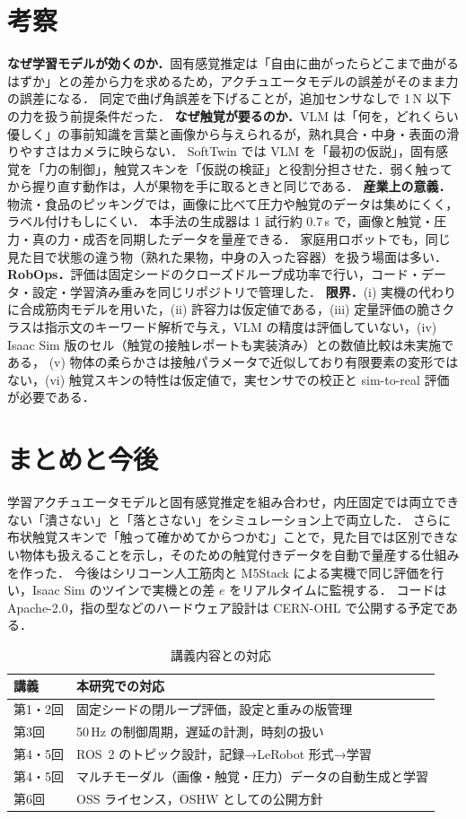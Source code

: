 \documentclass[a4paper,twocolumn,10pt]{ltjsarticle}
\begin{document}
\section{考察}
\textbf{なぜ学習モデルが効くのか．}固有感覚推定は「自由に曲がったらどこまで曲がるはずか」との差から力を求めるため，アクチュエータモデルの誤差がそのまま力の誤差になる．
同定で曲げ角誤差を下げることが，追加センサなしで 1\,N 以下の力を扱う前提条件だった．
\textbf{なぜ触覚が要るのか．}VLM は「何を，どれくらい優しく」の事前知識を言葉と画像から与えられるが，熟れ具合・中身・表面の滑りやすさはカメラに映らない．
SoftTwin では VLM を「最初の仮説」，固有感覚を「力の制御」，触覚スキンを「仮説の検証」と役割分担させた．弱く触ってから握り直す動作は，人が果物を手に取るときと同じである．
\textbf{産業上の意義．}物流・食品のピッキングでは，画像に比べて圧力や触覚のデータは集めにくく，ラベル付けもしにくい．
本手法の生成器は 1 試行約 0.7\,s で，画像と触覚・圧力・真の力・成否を同期したデータを量産できる．
家庭用ロボットでも，同じ見た目で状態の違う物（熟れた果物，中身の入った容器）を扱う場面は多い．
\textbf{RobOps．}評価は固定シードのクローズドループ成功率で行い，コード・データ・設定・学習済み重みを同じリポジトリで管理した．
\textbf{限界．}(i) 実機の代わりに合成筋肉モデルを用いた，(ii) 許容力は仮定値である，(iii) 定量評価の脆さクラスは指示文のキーワード解析で与え，VLM の精度は評価していない，(iv) Isaac Sim 版のセル（触覚の接触レポートも実装済み）との数値比較は未実施である，
(v) 物体の柔らかさは接触パラメータで近似しており有限要素の変形ではない，(vi) 触覚スキンの特性は仮定値で，実センサでの校正と sim-to-real 評価が必要である．

\section{まとめと今後}
学習アクチュエータモデルと固有感覚推定を組み合わせ，内圧固定では両立できない「潰さない」と「落とさない」をシミュレーション上で両立した．
さらに布状触覚スキンで「触って確かめてからつかむ」ことで，見た目では区別できない物体も扱えることを示し，そのための触覚付きデータを自動で量産する仕組みを作った．
今後はシリコーン人工筋肉と M5Stack による実機で同じ評価を行い，Isaac Sim のツインで実機との差 $e$ をリアルタイムに監視する．
コードは Apache-2.0，指の型などのハードウェア設計は CERN-OHL で公開する予定である．

\begin{table}[t]
\centering\small
\caption{講義内容との対応}
\begin{tabular}{@{}p{17mm}p{52mm}@{}}
\toprule
講義 & 本研究での対応 \\
\midrule
第1・2回 & 固定シードの閉ループ評価，設定と重みの版管理 \\
第3回 & 50\,Hz の制御周期，遅延の計測，時刻の扱い \\
第4・5回 & ROS~2 のトピック設計，記録→LeRobot 形式→学習 \\
第4・5回 & マルチモーダル（画像・触覚・圧力）データの自動生成と学習 \\
第6回 & OSS ライセンス，OSHW としての公開方針 \\
\bottomrule
\end{tabular}
\end{table}
\end{document}

